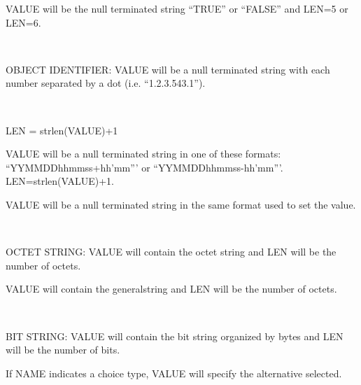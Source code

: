 \documentclass[]{article}
\begin{document}
VALUE will be the null terminated string ``TRUE'' or ``FALSE'' and LEN=5
or LEN=6.

~

OBJECT IDENTIFIER: VALUE will be a null terminated string with each
number separated by a dot (i.e. ``1.2.3.543.1'').

~

LEN = strlen(VALUE)+1


VALUE will be a null terminated string in one of these formats:
``YYMMDDhhmmss+hh'mm''' or ``YYMMDDhhmmss-hh'mm'''. LEN=strlen(VALUE)+1.


VALUE will be a null terminated string in the same format used to set
the value.

~

OCTET STRING: VALUE will contain the octet string and LEN will be the
number of octets.


VALUE will contain the generalstring and LEN will be the number of
octets.

~

BIT STRING: VALUE will contain the bit string organized by bytes and LEN
will be the number of bits.


If NAME indicates a choice type, VALUE will specify the alternative
selected.

\end{document}
